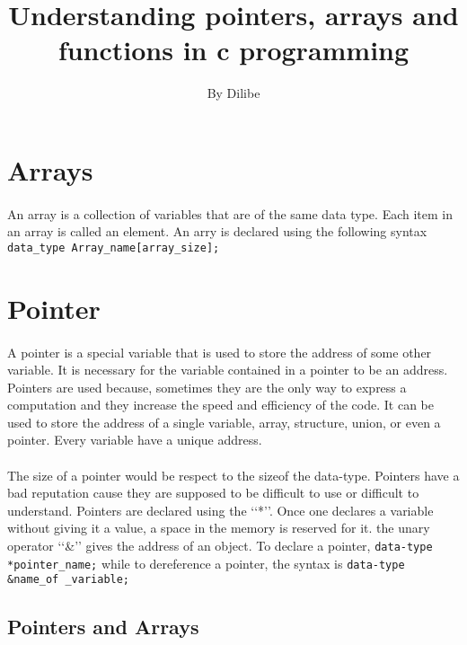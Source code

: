 \documentclass{article}
\title{Understanding pointers, arrays and functions in c programming}
\author{By Dilibe}
\begin{document}
	\maketitle
	\newpage
	\section{Arrays}
	\paragraph{}
	An array is a collection of variables that are of the same data type. Each item in an array is called an element. An arry is declared using the following syntax \lstinline{data_type Array_name[array_size];}
	\newpage
	\section{Pointer}
	\paragraph{}
	A pointer is a special variable that is used to store the address of some other variable. It is necessary for the variable contained in a pointer to be an address. Pointers are used because, sometimes they are the only way to express a computation and they increase the speed and efficiency of the code. It can be used to store the address of a single variable, array, structure, union, or even a pointer. Every variable have a unique address. 
	\paragraph{}
	The size of a pointer would be respect to the sizeof the data-type. Pointers have a bad reputation cause they are supposed to be difficult to use or difficult to understand. Pointers are declared using the \lq\lq{}*\rq\rq{}. Once one declares a variable without giving it a value, a space in the memory is reserved for it. the unary operator \lq\lq{}\&\rq\rq{} gives the address of an object. To declare a pointer, \lstinline{data-type *pointer_name;} while to dereference a pointer, the syntax is \lstinline{data-type &name_of _variable;}
	
	
	\subsection{Pointers and Arrays}
\end{document}
